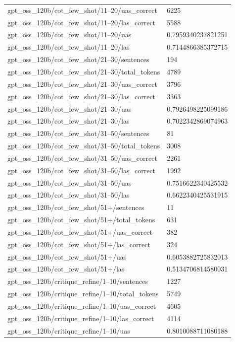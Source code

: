 \begin{tabular}{ll}
gpt\_oss\_120b/cot\_few\_shot/11–20/uas\_correct & 6225 \\
gpt\_oss\_120b/cot\_few\_shot/11–20/las\_correct & 5588 \\
gpt\_oss\_120b/cot\_few\_shot/11–20/uas & 0.7959340237821251 \\
gpt\_oss\_120b/cot\_few\_shot/11–20/las & 0.7144866385372715 \\
gpt\_oss\_120b/cot\_few\_shot/21–30/sentences & 194 \\
gpt\_oss\_120b/cot\_few\_shot/21–30/total\_tokens & 4789 \\
gpt\_oss\_120b/cot\_few\_shot/21–30/uas\_correct & 3796 \\
gpt\_oss\_120b/cot\_few\_shot/21–30/las\_correct & 3363 \\
gpt\_oss\_120b/cot\_few\_shot/21–30/uas & 0.7926498225099186 \\
gpt\_oss\_120b/cot\_few\_shot/21–30/las & 0.7022342869074963 \\
gpt\_oss\_120b/cot\_few\_shot/31–50/sentences & 81 \\
gpt\_oss\_120b/cot\_few\_shot/31–50/total\_tokens & 3008 \\
gpt\_oss\_120b/cot\_few\_shot/31–50/uas\_correct & 2261 \\
gpt\_oss\_120b/cot\_few\_shot/31–50/las\_correct & 1992 \\
gpt\_oss\_120b/cot\_few\_shot/31–50/uas & 0.7516622340425532 \\
gpt\_oss\_120b/cot\_few\_shot/31–50/las & 0.6622340425531915 \\
gpt\_oss\_120b/cot\_few\_shot/51+/sentences & 11 \\
gpt\_oss\_120b/cot\_few\_shot/51+/total\_tokens & 631 \\
gpt\_oss\_120b/cot\_few\_shot/51+/uas\_correct & 382 \\
gpt\_oss\_120b/cot\_few\_shot/51+/las\_correct & 324 \\
gpt\_oss\_120b/cot\_few\_shot/51+/uas & 0.6053882725832013 \\
gpt\_oss\_120b/cot\_few\_shot/51+/las & 0.5134706814580031 \\
gpt\_oss\_120b/critique\_refine/1–10/sentences & 1227 \\
gpt\_oss\_120b/critique\_refine/1–10/total\_tokens & 5749 \\
gpt\_oss\_120b/critique\_refine/1–10/uas\_correct & 4605 \\
gpt\_oss\_120b/critique\_refine/1–10/las\_correct & 4114 \\
gpt\_oss\_120b/critique\_refine/1–10/uas & 0.8010088711080188 \\

\end{tabular}
